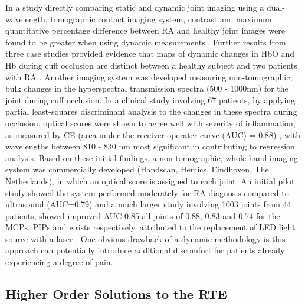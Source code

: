 \documentclass[twoside]{bhamthesis}
\theoremstyle{definition}
\begin{document}
In a study directly comparing static and dynamic joint imaging using a dual-wavelength, tomographic contact imaging system, contrast and maximum quantitative percentage difference between RA and healthy joint images were found to be greater when using dynamic measurements \cite{lasker2006comparison}. Further results from three case studies provided evidence that maps of dynamic changes in HbO and Hb during cuff occlusion are distinct between a healthy subject and two patients with RA \cite{lasker2007dynamic}. Another imaging system was developed measuring non-tomographic, bulk changes in the hyperspectral transmission spectra (500 - 1000nm) for the joint during cuff occlusion. In a clinical study involving 67 patients, by applying partial least-squares discriminant analysis to the changes in these spectra during occlusion, optical scores were shown to agree well with severity of inflammation, as measured by CE (area under the receiver-operater curve (AUC) = 0.88) \cite{meier2012potential}, with wavelengths between 810 - 830 nm most significant in contributing to regression analysis. Based on these initial findings, a non-tomographic, whole hand imaging system was commercially developed (Handscan, Hemics, Eindhoven, The Netherlands), in which an optical score is assigned to each joint. An initial pilot study showed the system performed moderately for RA diagnosis compared to ultrasound (AUC=0.79) \cite{van2016assessment} and a much larger study involving 1003 joints from 44 patients, showed improved AUC 0.85 all joints of 0.88, 0.83 and 0.74 for the MCPs, PIPs and wrists respectively, attributed to the replacement of LED light source with a laser \cite{besselink2018optical}. One obvious drawback of a dynamic methodology is  this approach can potentially introduce additional discomfort for patients already experiencing a degree of pain.

\subsection{Higher Order Solutions to the RTE}
\label{Higher Order Solutions to the RTE}
\end{document}
